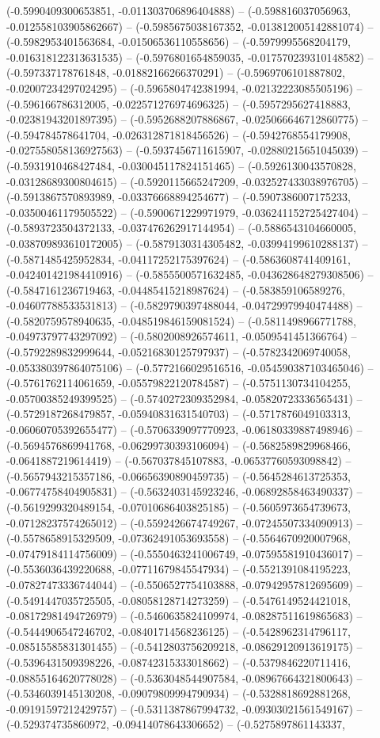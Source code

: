 (-0.5990409300653851, -0.011303706896404888) -- (-0.598816037056963, -0.012558103905862667) -- (-0.5985675038167352, -0.013812005142881074) -- (-0.5982953401563684, -0.01506536110558656) -- (-0.5979995568204179, -0.016318122313631535) -- (-0.5976801654859035, -0.017570239310148582) -- (-0.597337178761848, -0.01882166266370291) -- (-0.5969706101887802, -0.02007234297024295) -- (-0.5965804742381994, -0.02132223085505196) -- (-0.596166786312005, -0.022571276974696325) -- (-0.5957295627418883, -0.02381943201897395) -- (-0.5952688207886867, -0.025066646712860775) -- (-0.594784578641704, -0.026312871818456526) -- (-0.5942768554179908, -0.027558058136927563) -- (-0.5937456711615907, -0.02880215651045039) -- (-0.5931910468427484, -0.030045117824151465) -- (-0.5926130043570828, -0.03128689300804615) -- (-0.5920115665247209, -0.032527433038976705) -- (-0.5913867570893989, -0.03376668894254677) -- (-0.5907386007175233, -0.03500461179505522) -- (-0.5900671229971979, -0.036241152725427404) -- (-0.5893723504372133, -0.037476262917144954) -- (-0.5886543104660005, -0.038709893610172005) -- (-0.5879130314305482, -0.03994199610288137) -- (-0.5871485425952834, -0.04117252175397624) -- (-0.5863608741409161, -0.042401421984410916) -- (-0.5855500571632485, -0.043628648279308506) -- (-0.5847161236719463, -0.04485415218987624) -- (-0.583859106589276, -0.04607788533531813) -- (-0.5829790397488044, -0.04729979940474488) -- (-0.5820759578940635, -0.048519846159081524) -- (-0.5811498966771788, -0.04973797743297092) -- (-0.5802008926574611, -0.0509541451366764) -- (-0.5792289832999644, -0.05216830125797937) -- (-0.5782342069740058, -0.053380397864075106) -- (-0.5772166029516516, -0.054590387103465046) -- (-0.5761762114061659, -0.05579822120784587) -- (-0.5751130734104255, -0.05700385249399525) -- (-0.5740272309352984, -0.05820723336565431) -- (-0.5729187268479857, -0.05940831631540703) -- (-0.5717876049103313, -0.06060705392655477) -- (-0.5706339097770923, -0.06180339887498946) -- (-0.5694576869941768, -0.06299730393106094) -- (-0.5682589829968466, -0.0641887219614419) -- (-0.567037845107883, -0.06537760593098842) -- (-0.5657943215357186, -0.06656390890459735) -- (-0.5645284613725353, -0.06774758404905831) -- (-0.5632403145923246, -0.06892858463490337) -- (-0.5619299320489154, -0.07010686403825185) -- (-0.5605973654739673, -0.07128237574265012) -- (-0.5592426674749267, -0.07245507334090913) -- (-0.5578658915329509, -0.07362491053693558) -- (-0.5564670920007968, -0.07479184114756009) -- (-0.5550463241006749, -0.07595581910436017) -- (-0.5536036439220688, -0.07711679845547934) -- (-0.5521391084195223, -0.07827473336744044) -- (-0.5506527754103888, -0.07942957812695609) -- (-0.5491447035725505, -0.08058128714273259) -- (-0.5476149524421018, -0.08172981494726979) -- (-0.5460635824109974, -0.08287511619865683) -- (-0.5444906547246702, -0.08401714568236125) -- (-0.5428962314796117, -0.08515585831301455) -- (-0.5412803756209218, -0.08629120913619175) -- (-0.5396431509398226, -0.08742315333018662) -- (-0.5379846220711416, -0.08855164620778028) -- (-0.5363048544907584, -0.08967664321800643) -- (-0.5346039145130208, -0.09079809994790934) -- (-0.5328818692881268, -0.09191597212429757) -- (-0.5311387867994732, -0.09303021561549167) -- (-0.529374735860972, -0.09414078643306652) -- (-0.5275897861143337, 